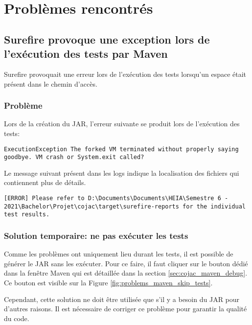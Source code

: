
\chapter{Problèmes rencontrés}

\section{Surefire provoque une exception lors de l'exécution des tests par Maven}

Surefire provoquait une erreur lors de l'exécution des tests lorsqu'un espace était présent dans le chemin d'accès.

\subsection{Problème}
\label{sec:problems_surefire_problem}

Lors de la création du \gls{JAR}, l'erreur suivante se produit lors de l'exécution des tests:

\begin{verbatim}
ExecutionException The forked VM terminated without properly saying goodbye. VM crash or System.exit called?
\end{verbatim}

Le message suivant présent dans les logs indique la localisation des fichiers qui contiennent plus de détails.
\begin{verbatim}
[ERROR] Please refer to D:\Documents\Documents\HEIA\Semestre 6 - 2021\Bachelor\Projet\cojac\target\surefire-reports for the individual test results.
\end{verbatim}

\subsection{Solution temporaire: ne pas exécuter les tests}

Comme les problèmes ont uniquement lieu durant les tests, il est possible de générer le \gls{JAR} sans les exécuter. Pour ce faire, il faut cliquer sur le bouton dédié dans la fenêtre \gls{Maven} qui est détaillée dans la section \ref{sec:cojac_maven_debug}. Ce bouton est visible sur la Figure \ref{fig:problems_maven_skip_tests}.

Cependant, cette solution ne doit être utilisée que s'il y a besoin du \gls{JAR} pour d'autres raisons. Il est nécessaire de corriger ce problème pour garantir la qualité du code.


